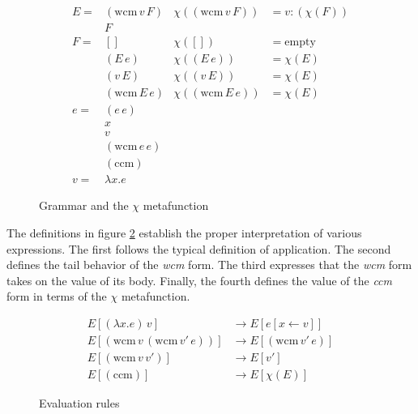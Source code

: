 \documentclass[ms]{byuprop}
\newcounter{definition}
\begin{document}

\begin{figure}
\begin{align*}
E = &(\mathrm{wcm}\,v\,F) & \chi((\mathrm{wcm}\,v\,F)) &= v : (\chi(F))\\
    &F\\
F = &[]                   & \chi([])                   &= \mathrm{empty}\\
    &(E\,e)               & \chi((E\,e))               &= \chi(E)\\
    &(v\,E)               & \chi((v\,E))               &= \chi(E)\\
    &(\mathrm{wcm}\,E\,e) & \chi((\mathrm{wcm}\,E\,e)) &= \chi(E)\\
e = &(e\,e)\\
    &x\\
    &v\\
    &(\mathrm{wcm}\,e\,e)\\
    &(\mathrm{ccm})\\
v = & \lambda x. e
\end{align*}
\caption{Grammar and the $\chi$ metafunction}
\label{language-definition}
\end{figure}

The definitions in figure \ref{language-semantics} establish the proper interpretation of 
various expressions. The first follows the typical definition of application. The second 
defines the tail behavior of the \emph{wcm} form. The third expresses that the \emph{wcm} 
form takes on the value of its body. Finally, the fourth defines the value of the \emph{ccm} 
form in terms of the $\chi$ metafunction.

\begin{figure}
\begin{align*}
E[(\lambda x.e)\,v]                         &\rightarrow E[e[x\leftarrow v]]\\
E[(\mathrm{wcm}\,v\,(\mathrm{wcm}\,v'\,e))] &\rightarrow E[(\mathrm{wcm}\,v'\,e)]\\
E[(\mathrm{wcm}\,v\,v')]                    &\rightarrow E[v']\\
E[(\mathrm{ccm})]                           &\rightarrow E[\chi(E)]
\end{align*}
\caption{Evaluation rules}
\label{language-semantics}
\end{figure}
\end{document}
